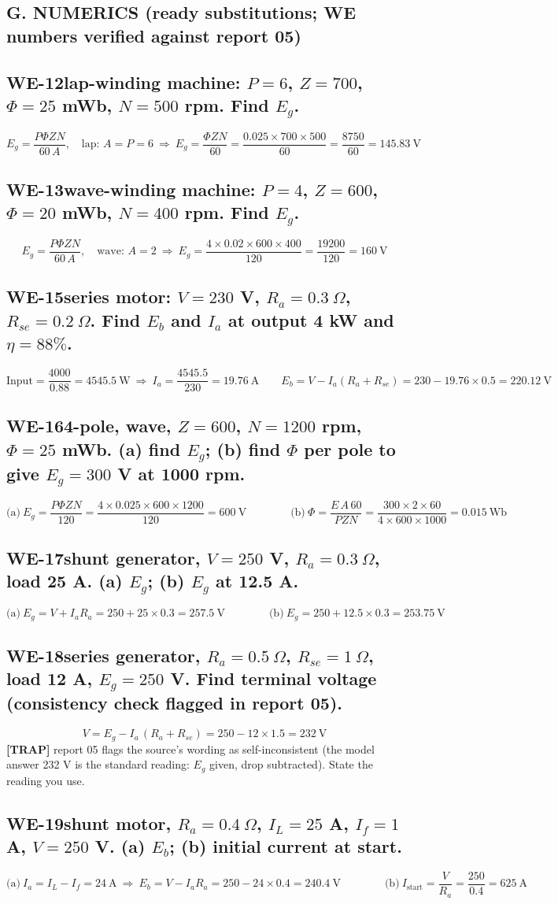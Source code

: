 \documentclass[11pt]{article}
\newcommand{\q}[2]{\subsection*{\color{copper}#1\quad\color{iron}#2}}
\newcommand{\tr}[1]{\textbf{\color{red}[TRAP]} #1}
\begin{document}
\hrulefill
\subsection*{\color{copper}G. NUMERICS (ready substitutions; WE numbers verified against report 05)}

\q{WE-12}{lap-winding machine: $P = 6$, $Z = 700$, $\Phi = 25$ mWb, $N = 500$ rpm. Find $E_g$.}
\[
E_g = \dfrac{P \Phi Z N}{60\, A},\quad \text{lap: } A = P = 6 \ \Rightarrow\ E_g = \dfrac{\Phi Z N}{60} = \dfrac{0.025 \times 700 \times 500}{60} = \dfrac{8750}{60} = 145.83\ \text{V}
\]

\q{WE-13}{wave-winding machine: $P = 4$, $Z = 600$, $\Phi = 20$ mWb, $N = 400$ rpm. Find $E_g$.}
\[
E_g = \dfrac{P \Phi Z N}{60\, A},\quad \text{wave: } A = 2 \ \Rightarrow\ E_g = \dfrac{4 \times 0.02 \times 600 \times 400}{120} = \dfrac{19200}{120} = 160\ \text{V}
\]

\q{WE-15}{series motor: $V = 230$ V, $R_a = 0.3\ \Omega$, $R_{se} = 0.2\ \Omega$. Find $E_b$ and $I_a$ at output 4 kW and $\eta = 88\%$.}
\[
\text{Input} = \dfrac{4000}{0.88} = 4545.5\ \text{W} \ \Rightarrow\ I_a = \dfrac{4545.5}{230} = 19.76\ \text{A}
\qquad
E_b = V - I_a(R_a + R_{se}) = 230 - 19.76 \times 0.5 = 220.12\ \text{V}
\]

\q{WE-16}{4-pole, wave, $Z = 600$, $N = 1200$ rpm, $\Phi = 25$ mWb. (a) find $E_g$; (b) find $\Phi$ per pole to give $E_g = 300$ V at 1000 rpm.}
\[
\text{(a)}\ E_g = \dfrac{P \Phi Z N}{120} = \dfrac{4 \times 0.025 \times 600 \times 1200}{120} = 600\ \text{V}
\qquad\qquad
\text{(b)}\ \Phi = \dfrac{E\, A\, 60}{P Z N} = \dfrac{300 \times 2 \times 60}{4 \times 600 \times 1000} = 0.015\ \text{Wb}
\]

\q{WE-17}{shunt generator, $V = 250$ V, $R_a = 0.3\ \Omega$, load 25 A. (a) $E_g$; (b) $E_g$ at 12.5 A.}
\[
\text{(a)}\ E_g = V + I_a R_a = 250 + 25 \times 0.3 = 257.5\ \text{V}
\qquad\qquad
\text{(b)}\ E_g = 250 + 12.5 \times 0.3 = 253.75\ \text{V}
\]

\q{WE-18}{series generator, $R_a = 0.5\ \Omega$, $R_{se} = 1\ \Omega$, load 12 A, $E_g = 250$ V. Find terminal voltage (consistency check flagged in report 05).}
\[
V = E_g - I_a\,(R_a + R_{se}) = 250 - 12 \times 1.5 = 232\ \text{V}
\]
\tr{report 05 flags the source's wording as self-inconsistent (the model answer 232 V is the standard reading: $E_g$ given, drop subtracted). State the reading you use.}

\q{WE-19}{shunt motor, $R_a = 0.4\ \Omega$, $I_L = 25$ A, $I_f = 1$ A, $V = 250$ V. (a) $E_b$; (b) initial current at start.}
\[
\text{(a)}\ I_a = I_L - I_f = 24\ \text{A}\ \Rightarrow\ E_b = V - I_a R_a = 250 - 24 \times 0.4 = 240.4\ \text{V}
\qquad\qquad
\text{(b)}\ I_{\text{start}} = \dfrac{V}{R_a} = \dfrac{250}{0.4} = 625\ \text{A}
\]
\end{document}
